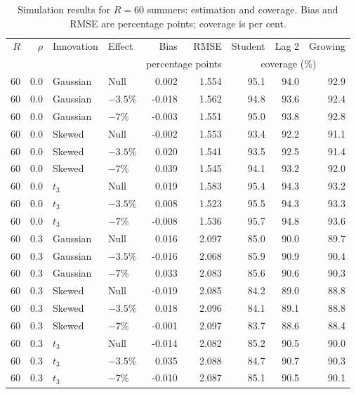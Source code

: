\begin{table}[H]
\centering
\normalsize\renewcommand{\arraystretch}{1.55}\setlength{\tabcolsep}{4pt}
\caption{Simulation results for $R=60$ summers: estimation and coverage. Bias and RMSE are percentage points; coverage is per cent.}
\label{tab:year-simulation-complete-a-r60}
\begin{tabular*}{\textwidth}{@{\extracolsep{\fill}}rrllrrrrr}
\toprule
$R$ & $\rho$ & Innovation & Effect & Bias & RMSE & Student & Lag 2 & Growing \\
 & & & & \multicolumn{2}{c}{percentage points} & \multicolumn{3}{c}{coverage (\%)} \\
\midrule
60 & 0.0 & Gaussian & Null & 0.002 & 1.554 & 95.1 & 94.0 & 92.9 \\
60 & 0.0 & Gaussian & $-3.5\%$ & -0.018 & 1.562 & 94.8 & 93.6 & 92.4 \\
60 & 0.0 & Gaussian & $-7\%$ & -0.003 & 1.551 & 95.0 & 93.8 & 92.8 \\
60 & 0.0 & Skewed & Null & -0.002 & 1.553 & 93.4 & 92.2 & 91.1 \\
60 & 0.0 & Skewed & $-3.5\%$ & 0.020 & 1.541 & 93.5 & 92.5 & 91.4 \\
60 & 0.0 & Skewed & $-7\%$ & 0.039 & 1.545 & 94.1 & 93.2 & 92.0 \\
60 & 0.0 & $t_3$ & Null & 0.019 & 1.583 & 95.4 & 94.3 & 93.2 \\
60 & 0.0 & $t_3$ & $-3.5\%$ & 0.008 & 1.523 & 95.5 & 94.3 & 93.3 \\
60 & 0.0 & $t_3$ & $-7\%$ & -0.008 & 1.536 & 95.7 & 94.8 & 93.6 \\
60 & 0.3 & Gaussian & Null & 0.016 & 2.097 & 85.0 & 90.0 & 89.7 \\
60 & 0.3 & Gaussian & $-3.5\%$ & -0.016 & 2.068 & 85.9 & 90.9 & 90.4 \\
60 & 0.3 & Gaussian & $-7\%$ & 0.033 & 2.083 & 85.6 & 90.6 & 90.3 \\
60 & 0.3 & Skewed & Null & -0.019 & 2.085 & 84.2 & 89.0 & 88.8 \\
60 & 0.3 & Skewed & $-3.5\%$ & 0.018 & 2.096 & 84.1 & 89.1 & 88.8 \\
60 & 0.3 & Skewed & $-7\%$ & -0.001 & 2.097 & 83.7 & 88.6 & 88.4 \\
60 & 0.3 & $t_3$ & Null & -0.014 & 2.082 & 85.2 & 90.5 & 90.0 \\
60 & 0.3 & $t_3$ & $-3.5\%$ & 0.035 & 2.088 & 84.7 & 90.7 & 90.3 \\
60 & 0.3 & $t_3$ & $-7\%$ & -0.010 & 2.087 & 85.1 & 90.5 & 90.1 \\

\end{tabular*}
\end{table}

